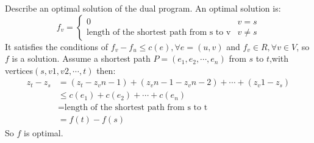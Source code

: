 \documentclass[11pt,a4paper,oneside]{article}
\begin{document}
\begin{problem}{5}
	\statement
  Describe an optimal solution of the dual program.
    \solution
	An optimal solution is:
	\begin{equation}
	f_v=
	\begin{cases}
	0& v=s\\
	\text{length of the shortest path from s to v}&v\neq s
	\end{cases}
	\end{equation}
	It satisfies the conditions of $f_v-f_u\leq c(e),\forall e=(u,v)$ and $f_v\in R,\forall v\in V$, so $f$ is a solution.
	Assume a shortest path $P=(e_1,e_2,\cdots,e_n)$ from $s$ to $t$,with vertices$(s,v1,v2,\cdots,t)$ then:
	\begin{align*}
	z_t-z_s&=(z_t-z_vn-1)+(z_vn-1-z_vn-2)+\cdots+(z_v1-z_s)\\
	&\leq c(e_1)+c(e_2)+\cdots+c(e_n)\\
	&=\text{length of the shortest path from s to t}\\
	&= f(t)-f(s)
	\end{align*}
	So $f$ is optimal.
\end{problem}
\end{document}
